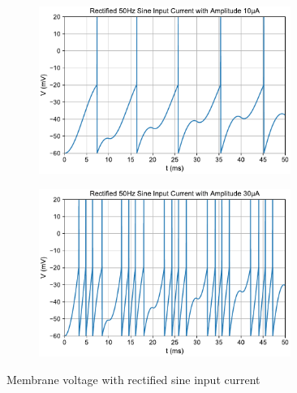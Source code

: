 \documentclass{scrartcl}
\begin{document}
\begin{figure}[p]
	\centering
	\begin{subfigure}{\textwidth}
	\includegraphics[width=0.9\textwidth]{figures/V_sine_10.pdf}
	\vspace{0.8cm}
	\end{subfigure}
	\begin{subfigure}{\textwidth}
	\includegraphics[width=0.9\textwidth]{figures/V_sine_30.pdf}
	\end{subfigure}
	\vspace{0.8cm}
	\caption{Membrane voltage with rectified sine input current}
	\label{fig:V_sine}
\end{figure}
\end{document}
